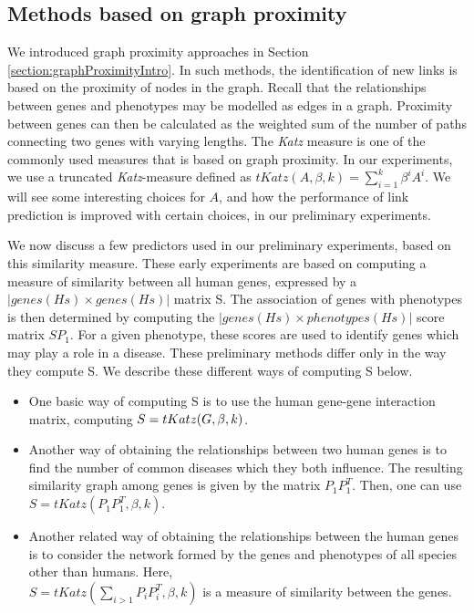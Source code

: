 \subsection{Methods based on graph proximity}
We introduced graph proximity approaches in Section \ref{section:graphProximityIntro}. In such methods, the identification of new links is based on the proximity of nodes in the graph. Recall that the relationships between genes and phenotypes may be modelled as edges in a graph. Proximity between genes can then be calculated as the weighted sum of the number of paths connecting two genes with varying lengths. The \emph{Katz} measure is one of the commonly used measures that is based on graph proximity. In our experiments, we use a truncated \emph{Katz}-measure defined as $tKatz(A, \beta, k) = \sum_{i=1}^{k}\beta^i A^i$. We will see some interesting choices for $A$, and how the performance of link prediction is improved with certain choices, in our preliminary experiments. 

We now discuss a few predictors used in our preliminary experiments, based on this similarity measure. These early experiments are based on computing a measure of similarity between all human genes, expressed by a $|genes(Hs) \times genes(Hs)|$ matrix S. The association of genes with phenotypes is then determined by computing the $|genes(Hs) \times phenotypes(Hs)|$ score matrix $S P_1$. For a given phenotype, these scores are used to identify genes which may play a role in a disease. These preliminary methods differ only in the way they compute S. We describe these different ways of computing S below.

\begin{itemize}
 \item One basic way of computing S is to use the human gene-gene interaction matrix, computing $S = tKatz(G, \beta, k)$.
 \item Another way of obtaining the relationships between two human genes is to find the number of common diseases which they both influence. The resulting similarity graph among genes is given by the matrix $P_1P_1^T$. Then, one can use $S = tKatz(P_1P_1^T, \beta, k)$.
 \item Another related way of obtaining the relationships between the human genes is to consider the network formed by the genes and phenotypes of all species other than humans. Here, \\$S = tKatz(\sum_{i>1} P_i P_i^T, \beta, k)$ is a measure of similarity between the genes.
\end{itemize}

